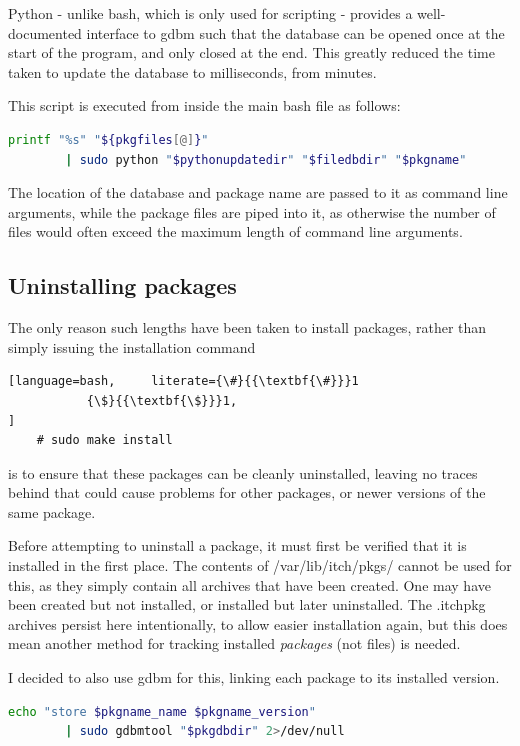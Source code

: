 \documentclass[10pt]{article}
\begin{document}
Python - unlike bash, which is only used for scripting - provides a well-documented interface to gdbm \cite{gdbmPython} such that the database can be opened once at the start of the program, and only closed at the end. This greatly reduced the time taken to update the database to milliseconds, from minutes.

This script is executed from inside the main bash file as follows:

\begin{lstlisting}[language=bash]
    printf "%s" "${pkgfiles[@]}"
        | sudo python "$pythonupdatedir" "$filedbdir" "$pkgname"
\end{lstlisting}

The location of the database and package name are passed to it as command line arguments, while the package files are piped into it, as otherwise the number of files would often exceed the maximum length of command line arguments.

\subsection{Uninstalling packages}

The only reason such lengths have been taken to install packages, rather than simply issuing the installation command
\begin{lstlisting}[language=bash,     literate={\#}{{\textbf{\#}}}1
           {\$}{{\textbf{\$}}}1,
]
    # sudo make install
\end{lstlisting}
is to ensure that these packages can be cleanly uninstalled, leaving no traces behind that could cause problems for other packages, or newer versions of the same package.

Before attempting to uninstall a package, it must first be verified that it is installed in the first place. The contents of /var/lib/itch/pkgs/ cannot be used for this, as they simply contain all archives that have been created. One may have been created but not installed, or installed but later uninstalled. The .itchpkg archives persist here intentionally, to allow easier installation again, but this does mean another method for tracking installed \textit{packages} (not files) is needed.

I decided to also use gdbm for this, linking each package to its installed version.

\begin{lstlisting}[language=bash]
    echo "store $pkgname_name $pkgname_version"
        | sudo gdbmtool "$pkgdbdir" 2>/dev/null
\end{lstlisting}
\end{document}
